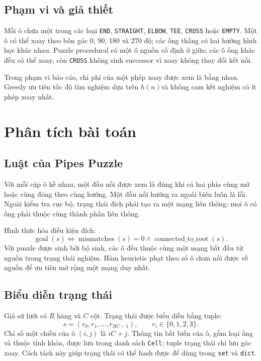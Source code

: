 \documentclass[12pt,a4paper]{article}
\newcommand{\code}[1]{\texttt{#1}}
\newcommand{\Hn}{\ensuremath{h(n)}}
\begin{document}
\subsection{Phạm vi và giả thiết}
Mỗi ô chứa một trong các loại \code{END}, \code{STRAIGHT}, \code{ELBOW}, \code{TEE}, \code{CROSS} hoặc \code{EMPTY}. Một ô có thể xoay theo bốn góc 0, 90, 180 và 270 độ; các ống thẳng có hai hướng hình học khác nhau. Puzzle procedural có một ô nguồn cố định ở giữa; các ô ống khác đều có thể xoay, còn \code{CROSS} không sinh successor vì xoay không thay đổi kết nối.

Trong phạm vi báo cáo, chi phí của một phép xoay được xem là bằng nhau. Greedy ưu tiên tốc độ tìm nghiệm dựa trên \Hn và không cam kết nghiệm có ít phép xoay nhất.

\section{Phân tích bài toán}
\subsection{Luật của Pipes Puzzle}
Với mỗi cặp ô kề nhau, một đầu nối được xem là đúng khi cả hai phía cùng mở hoặc cùng đóng theo cùng hướng. Một đầu nối hướng ra ngoài biên luôn là lỗi. Ngoài kiểm tra cục bộ, trạng thái đích phải tạo ra một mạng liên thông: mọi ô có ống phải thuộc cùng thành phần liên thông.

Hình thức hóa điều kiện đích:
\begin{equation}
  \operatorname{goal}(s) \Longleftrightarrow
  \operatorname{mismatches}(s)=0
  \land \operatorname{connected\_to\_root}(s).
\end{equation}
Với puzzle được sinh bởi bộ sinh, các ô đều thuộc cùng một mạng bắt đầu từ nguồn trong trạng thái nghiệm. Hàm heuristic phạt theo số ô chưa nối được về nguồn để ưu tiên mở rộng một mạng duy nhất.

\subsection{Biểu diễn trạng thái}
Giả sử lưới có \(R\) hàng và \(C\) cột. Trạng thái được biểu diễn bằng tuple:
\begin{equation}
  s=(r_0,r_1,\ldots,r_{RC-1}),\qquad r_i\in\{0,1,2,3\}.
\end{equation}
Chỉ số một chiều của ô \((i,j)\) là \(iC+j\). Thông tin bất biến của ô, gồm loại ống và thuộc tính khóa, được lưu trong danh sách \code{Cell}; tuple trạng thái chỉ lưu góc xoay. Cách tách này giúp trạng thái có thể hash được để dùng trong \code{set} và \code{dict}.
\end{document}
